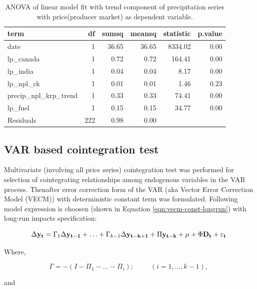 \documentclass[12pt,]{article}
\begin{document}
\begin{table}

\caption{\label{tab:lm3-anova-producer-market-tab}ANOVA of linear model fit with trend component of precipitation series with price(producer market) as dependent variable.}
\centering
\begin{tabular}[t]{lrrrrr}
\toprule
term & df & sumsq & meansq & statistic & p.value\\
\midrule
date & 1 & 36.65 & 36.65 & 8334.02 & 0.00\\
lp\_canada & 1 & 0.72 & 0.72 & 164.41 & 0.00\\
lp\_india & 1 & 0.04 & 0.04 & 8.17 & 0.00\\
lp\_npl\_ck & 1 & 0.01 & 0.01 & 1.46 & 0.23\\
precip\_npl\_krp\_trend & 1 & 0.33 & 0.33 & 74.41 & 0.00\\
\addlinespace
lp\_fuel & 1 & 0.15 & 0.15 & 34.77 & 0.00\\
Residuals & 222 & 0.98 & 0.00 &  & \\
\bottomrule
\end{tabular}
\end{table}

\hypertarget{var-based-cointegration-test-1}{%
\subsection{VAR based cointegration test}\label{var-based-cointegration-test-1}}

Multivariate (involving all price series) cointegration test was performed for selection of cointegrating relationships among endogenous variables in the VAR process. Thenafter error correction form of the VAR (aka Vector Error Correction Model (VECM)) with deterministic constant term was formulated. Following model expression is choosen (shown in Equation \ref{eqn:vecm-const-longrun}) with long-run impacts specification:

\begin{equation}
\label{eqn:vecm-const-longrun}
\Delta {\bf y_t} = \Gamma_1 \Delta {\bf y_{t-1}} + \ldots + \Gamma_{k-1} \Delta {\bf y_{t-k+1}} + \Pi{\bf y_{t-k}} + {\bf \mu} + \Phi {\bf D_t} + {\bf \varepsilon_t}
\end{equation}

Where,

\[
\Gamma = -(I - \Pi_{1} - \ldots - \Pi_i);\hspace{1cm} (i = 1, \ldots, k-1),
\]

and
\end{document}
